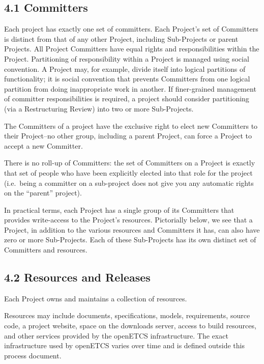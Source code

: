 \subsection{4.1 Committers}\label{committers}

Each project has exactly one set of committers. Each Project's set of
Committers is distinct from that of any other Project, including
Sub-Projects or parent Projects. All Project Committers have equal
rights and responsibilities within the Project. Partitioning of
responsibility within a Project is managed using social convention. A
Project may, for example, divide itself into logical partitions of
functionality; it is social convention that prevents Committers from one
logical partition from doing inappropriate work in another. If
finer-grained management of committer responsibilities is required, a
project should consider partitioning (via a Restructuring Review) into
two or more Sub-Projects.

The Committers of a project have the exclusive right to elect new
Committers to their Project--no other group, including a parent Project,
can force a Project to accept a new Committer.

There is no roll-up of Committers: the set of Committers on a Project is
exactly that set of people who have been explicitly elected into that
role for the project (i.e.~being a committer on a sub-project does not
give you any automatic rights on the ``parent'' project).

In practical terms, each Project has a single group of its Committers
that provides write-access to the Project's resources. Pictorially
below, we see that a Project, in addition to the various resources and
Committers it has, can also have zero or more Sub-Projects. Each of
these Sub-Projects has its own distinct set of Committers and resources.

\subsection{4.2 Resources and Releases}\label{resources-and-releases}

Each Project owns and maintains a collection of resources.

Resources may include documents, specifications, models, requirements,
source code, a project website, space on the downloads server, access to
build resources, and other services provided by the openETCS
infrastructure. The exact infrastructure used by openETCS varies over
time and is defined outside this process document.

